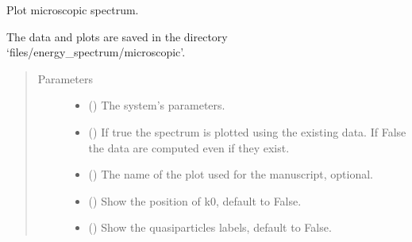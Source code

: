 \documentclass[letterpaper,10pt,english]{sphinxmanual}
\begin{document}
\begin{fulllineitems}
\label{\detokenize{modules:modules.utils.plot_spectrum_micro}}
\pysigstartsignatures
{}
\pysigstopsignatures
\sphinxAtStartPar
Plot microscopic spectrum.

\sphinxAtStartPar
The data and plots are saved in the directory ‘files/energy\_spectrum/microscopic’.
\begin{quote}\begin{description}
\item[{Parameters}] \leavevmode\begin{itemize}
\item {} 
\sphinxAtStartPar
{} () \textendash{} The system’s parameters.

\item {} 
\sphinxAtStartPar
{} () \textendash{} If true the spectrum is plotted using the existing data.
If False the data are computed even if they exist.

\item {} 
\sphinxAtStartPar
{} () \textendash{} The name of the plot used for the manuscript, optional.

\item {} 
\sphinxAtStartPar
{} () \textendash{} Show the position of k0, default to False.

\item {} 
\sphinxAtStartPar
{} () \textendash{} Show the quasiparticles labels, default to False.

\end{itemize}

\end{description}\end{quote}

\end{fulllineitems}
\end{document}
